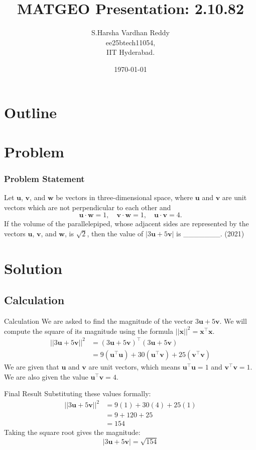 \documentclass{beamer}
\title{MATGEO Presentation: 2.10.82}
\author{S.Harsha Vardhan Reddy \\ ee25btech11054,\\IIT Hyderabad.}
\date{\today}
\theoremstyle{remark}
\let\vec\mathbf
\numberwithin{equation}{section}
\begin{document}
\begin{frame}
\titlepage
\end{frame}

\section*{Outline}
\begin{frame}
\tableofcontents
\end{frame}

\section{Problem}
\begin{frame}[fragile]
\frametitle{Problem Statement}
Let $\vec{u}$, $\vec{v}$, and $\vec{w}$ be vectors in three-dimensional space, where $\vec{u}$ and $\vec{v}$ are unit vectors which are not perpendicular to each other and
$$ \vec{u}\cdot\vec{w} = 1, \quad \vec{v}\cdot\vec{w} = 1, \quad \vec{u}\cdot\vec{v} = 4. $$
If the volume of the parallelepiped, whose adjacent sides are represented by the vectors $\vec{u}$, $\vec{v}$, and $\vec{w}$, is $\sqrt{2}$, then the value of $|3\vec{u} + 5\vec{v}|$ is \_\_\_\_\_\_\_. (2021)
\end{frame}

\section{Solution}
\subsection{Calculation}
\begin{frame}{Calculation}
We are asked to find the magnitude of the vector $3\vec{u} + 5\vec{v}$. We will compute the square of its magnitude using the formula $||\vec{x}||^2 = \vec{x}^\top\vec{x}$.
\begin{align}
    ||3\vec{u} + 5\vec{v}||^2 &= (3\vec{u} + 5\vec{v})^\top (3\vec{u} + 5\vec{v}) \\
    &= 9(\vec{u}^\top\vec{u}) + 30(\vec{u}^\top\vec{v}) + 25(\vec{v}^\top\vec{v})
\end{align}
We are given that $\vec{u}$ and $\vec{v}$ are unit vectors, which means $\vec{u}^\top\vec{u} = 1$ and $\vec{v}^\top\vec{v} = 1$. We are also given the value $\vec{u}^\top\vec{v} = 4$.
\end{frame}

\begin{frame}{Final Result}
Substituting these values formally:
\begin{align}
    ||3\vec{u} + 5\vec{v}||^2 &= 9(1) + 30(4) + 25(1) \\
    &= 9 + 120 + 25 \nonumber \\
    &= 154
\end{align}
Taking the square root gives the magnitude:
\begin{equation}
    |3\vec{u} + 5\vec{v}| = \sqrt{154}
\end{equation}
\end{frame}
\end{document}

